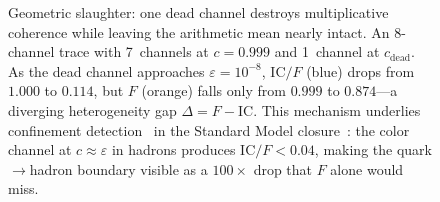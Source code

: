 \documentclass[
  aps,
  prd,
  twocolumn,
  superscriptaddress,
  nofootinbib,
  floatfix
]{revtex4-2}
\newcommand{\eps}{\varepsilon}
\newcommand{\IC}{\mathrm{IC}}
\begin{document}
\begin{figure}[t!]
\caption{Geometric slaughter: one dead channel destroys
multiplicative coherence while leaving the arithmetic mean
nearly intact.  An 8-channel trace with 7~channels at
$c = 0.999$ and 1~channel at $c_\mathrm{dead}$.  As the dead
channel approaches $\eps = 10^{-8}$, $\IC/F$ (blue) drops
from $1.000$ to $0.114$, but $F$ (orange) falls only from
$0.999$ to $0.874$---a diverging heterogeneity gap
$\Delta = F - \IC$.  This mechanism underlies confinement
detection~\cite{wilson1974confinement} in the Standard Model
closure~\cite{pdg2024}: the color channel at $c \approx \eps$
in hadrons produces $\IC/F < 0.04$, making the
quark${\to}$hadron boundary visible as a $100{\times}$ drop
that $F$ alone would miss.}
\label{fig:slaughter}
\end{figure}
\end{document}
